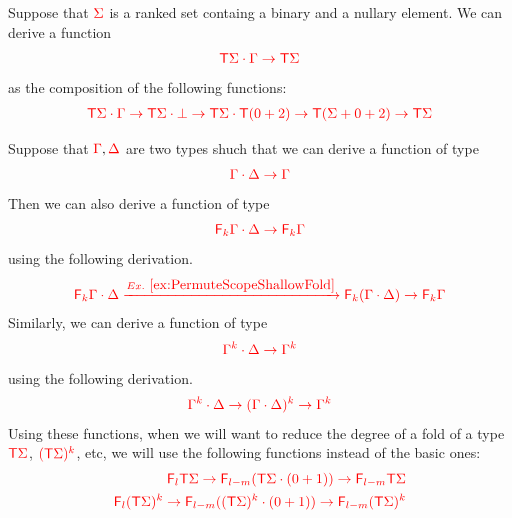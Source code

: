  \begin{example}
 Suppose that ${\color{red}{\Sigma}}$ is a ranked set containg a binary and a nullary element. We can derive a function
 \begin{align*}
{\color{red}{{\color{red}{\mathsf T}}\Sigma\cdot\Gamma\to {\color{red}{\mathsf T}}\Sigma}}
 \end{align*}
 as the composition of the following functions:
 \begin{align*}
{\color{red}{{\color{red}{\mathsf T}}\Sigma\cdot\Gamma\to {\color{red}{\mathsf T}}\Sigma\cdot\bot\to{\color{red}{\mathsf T}}\Sigma\cdot{\color{red}{\mathsf T}}(0+2)\to {\color{red}{\mathsf T}}(\Sigma+0+2) \to {\color{red}{\mathsf T}}\Sigma}} 
 \end{align*}

Suppose that ${\color{red}{\Gamma}}, {\color{red}{\Delta}}$ are two types shuch that we can derive a function of type 
 \begin{align*}
 {\color{red}{\Gamma\cdot\Delta\to \Gamma}}
 \end{align*}
Then we can also derive a function of type 
\begin{align*}
{\color{red}{{\color{red}{\mathsf F_{k}}}\Gamma\cdot\Delta\to {\color{red}{\mathsf F_{k}}}\Gamma}}
\end{align*}
using the following derivation. 
\begin{align*}
{\color{red}{{\color{red}{\mathsf F_{k}}}\Gamma\cdot\Delta\xrightarrow{Ex.~\ref{ex:PermuteScopeShallowFold}} {\color{red}{\mathsf F_{k}}}(\Gamma\cdot\Delta) \to {\color{red}{\mathsf F_{k}}}\Gamma}}
\end{align*}
Similarly, we can derive a function of type
\begin{align*}
{\color{red}{ \Gamma^k\cdot\Delta\to \Gamma^k}}
\end{align*}
using the following derivation. 
\begin{align*}
{\color{red}{\Gamma^k\cdot\Delta\to (\Gamma\cdot\Delta)^k \to \Gamma^k}}
\end{align*}
Using these functions, when we will want to reduce the degree of a fold of a type ${\color{red}{{\color{red}{\mathsf T}}\Sigma}}$, ${\color{red}{({\color{red}{\mathsf T}}\Sigma)^k}}$, etc, we will use the following functions instead of the basic ones:
\begin{align*}
{\color{red}{{\color{red}{\mathsf F_{l}}}{\color{red}{\mathsf T}}\Sigma\to {\color{red}{\mathsf F_{l-m}}}({\color{red}{\mathsf T}}\Sigma\cdot(0+1))\to {\color{red}{\mathsf F_{l-m}}}{\color{red}{\mathsf T}}\Sigma }}\\
{\color{red}{{\color{red}{\mathsf F_{l}}}({\color{red}{\mathsf T}}\Sigma)^k\to {\color{red}{\mathsf F_{l-m}}}(({\color{red}{\mathsf T}}\Sigma)^k\cdot(0+1))\to {\color{red}{\mathsf F_{l-m}}}({\color{red}{\mathsf T}}\Sigma)^k }}
\end{align*} 
\end{example}


